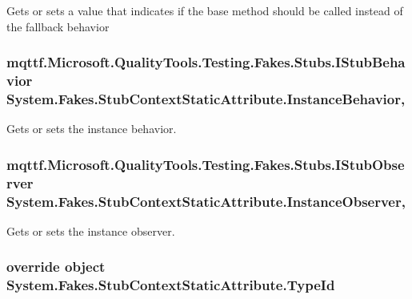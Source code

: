 Gets or sets a value that indicates if the base method should be called instead of the fallback behavior

\hypertarget{class_system_1_1_fakes_1_1_stub_context_static_attribute_a23845da1c8365827dac10bfd2be89aad}{
\subsubsection[{Instance\-Behavior}]{\setlength{\rightskip}{0pt plus 5cm}mqttf.\-Microsoft.\-Quality\-Tools.\-Testing.\-Fakes.\-Stubs.\-I\-Stub\-Behavior System.\-Fakes.\-Stub\-Context\-Static\-Attribute.\-Instance\-Behavior\hspace{0.3cm}{\ttfamily [get]}, {\ttfamily [set]}}}\label{class_system_1_1_fakes_1_1_stub_context_static_attribute_a23845da1c8365827dac10bfd2be89aad}


Gets or sets the instance behavior.

\hypertarget{class_system_1_1_fakes_1_1_stub_context_static_attribute_a0430931fbdbbf4d5f9007ecb06351f15}{
\subsubsection[{Instance\-Observer}]{\setlength{\rightskip}{0pt plus 5cm}mqttf.\-Microsoft.\-Quality\-Tools.\-Testing.\-Fakes.\-Stubs.\-I\-Stub\-Observer System.\-Fakes.\-Stub\-Context\-Static\-Attribute.\-Instance\-Observer\hspace{0.3cm}{\ttfamily [get]}, {\ttfamily [set]}}}\label{class_system_1_1_fakes_1_1_stub_context_static_attribute_a0430931fbdbbf4d5f9007ecb06351f15}


Gets or sets the instance observer.

\hypertarget{class_system_1_1_fakes_1_1_stub_context_static_attribute_ae29095db29f16f93cb7fba1ac5b5dadf}{
\subsubsection[{Type\-Id}]{\setlength{\rightskip}{0pt plus 5cm}override object System.\-Fakes.\-Stub\-Context\-Static\-Attribute.\-Type\-Id\hspace{0.3cm}{\ttfamily [get]}}}\label{class_system_1_1_fakes_1_1_stub_context_static_attribute_ae29095db29f16f93cb7fba1ac5b5dadf}


